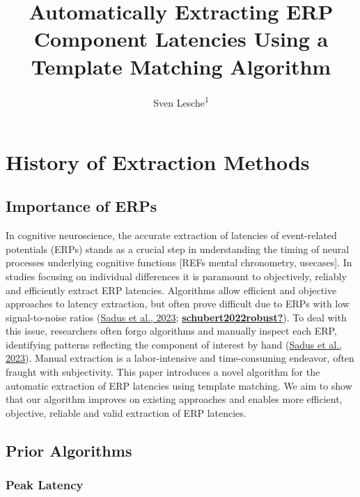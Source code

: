 \documentclass[
  man,floatsintext]{apa7}
\title{Automatically Extracting ERP Component Latencies Using a Template Matching Algorithm}
\author{Sven Lesche\textsuperscript{1}}
\date{}
\affiliation{\vspace{0.5cm}\textsuperscript{1} Ruprecht-Karls-University Heidelberg}
\begin{document}
\maketitle

\hypertarget{history-of-extraction-methods}{%
\section{History of Extraction Methods}\label{history-of-extraction-methods}}

\hypertarget{importance-of-erps}{%
\subsection{Importance of ERPs}\label{importance-of-erps}}

In cognitive neuroscience, the accurate extraction of latencies of event-related potentials (ERPs) stands as a crucial step in understanding the timing of neural processes underlying cognitive functions {[}REFs mental chronometry, usecases{]}. In studies focusing on individual differences it is paramount to objectively, reliably and efficiently extract ERP latencies. Algorithms allow efficient and objective approaches to latency extraction, but often prove difficult due to ERPs with low signal-to-noise ratios (\protect\hyperlink{ref-sadus2023multiverse}{Sadus et al., 2023}; \protect\hyperlink{ref-schubert2022robust}{\textbf{schubert2022robust?}}). To deal with this issue, researchers often forgo algorithms and manually inspect each ERP, identifying patterns reflecting the component of interest by hand (\protect\hyperlink{ref-sadus2023multiverse}{Sadus et al., 2023}). Manual extraction is a labor-intensive and time-consuming endeavor, often fraught with subjectivity. This paper introduces a novel algorithm for the automatic extraction of ERP latencies using template matching. We aim to show that our algorithm improves on existing approaches and enables more efficient, objective, reliable and valid extraction of ERP latencies.

\hypertarget{prior-algorithms}{%
\subsection{Prior Algorithms}\label{prior-algorithms}}

\hypertarget{peak-latency}{%
\subsubsection{Peak Latency}\label{peak-latency}}
\end{document}
